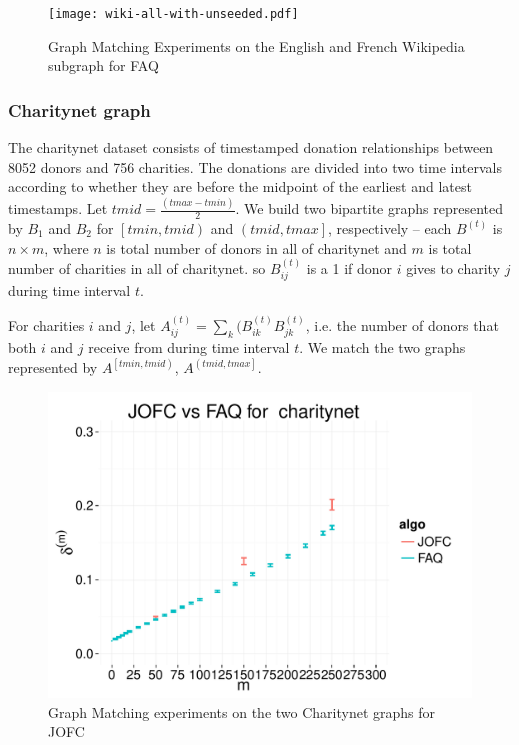 \documentclass[12pt,oneside,final]{thesis}\usepackage[]{graphicx}\usepackage[]{color}
\begin{document}
\begin{figure}
\texttt{[image: wiki-all-with-unseeded.pdf]}
\caption{Graph Matching Experiments on the English and French Wikipedia subgraph for FAQ \label{wiki_graphmatch}}
\end{figure}
      
\subsubsection{Charitynet graph}

The charitynet dataset consists  of timestamped donation relationships between 8052 donors and 756 charities. The donations are divided into two time intervals according to whether they are before the midpoint of the earliest and latest timestamps.
Let $tmid = \frac{(tmax - tmin)}{2}$.
We build two bipartite graphs represented by $B_1$ and $B_2$ for $\left[tmin,tmid\right)$ and $\left(tmid,tmax\right]$, respectively --
each $B^{(t)}$ is $n \times m$, where $n$ is total number of donors in all of charitynet and $m$ is total number of charities in all of charitynet.
so $B_{ij}^{(t)}$ is a 1 if donor $i$ gives to charity $j$ during time interval $t$.

For charities $i$ and $j$,
let $A_{ij}^{(t)}= \sum_{k}{(B_{ik}^{(t)}B_{jk}^{(t)}}$, i.e. the number of donors that both $i$ and $j$ receive from during time interval $t$.
We match the two graphs represented by  $A^{\left[tmin,tmid\right)}$, $A^{\left(tmid,tmax\right]}$.
\begin{figure}
\includegraphics[scale=0.4]{charitynet_SGM_JOFCvsFAQ}
\caption{Graph Matching experiments on the two Charitynet graphs for JOFC \label{charitynet_graphmatch}}
\end{figure}
\end{document}
